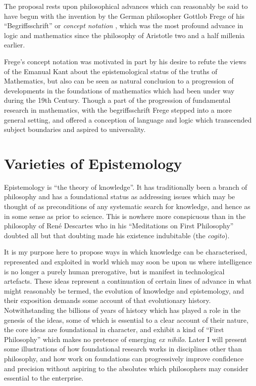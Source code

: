 \documentclass[10pt,titlepage]{book}
\begin{document}
The proposal rests upon philosophical advances which can reasonably be said to have begun with the invention by the German philosopher Gottlob Frege of his ``Begriffsschrift'' or \emph{concept notation} \cite{frege79,heijenoort67}, which was the most profound advance in logic and mathematics since the philosophy of Aristotle two and a half millenia earlier.

Frege's concept notation was motivated in part by his desire to refute the views of the Emanual Kant about the epistemological status of the truths of Mathematics, but also can be seen as natural conclusion to a progression of developments in the foundations of mathematics which had been under way during the 19th Century.
Though a part of the progression of fundamental research in mathematics, with the begriffsschrift Frege stepped into a more general setting, and offered a conception of language and logic which transcended subject boundaries and aspired to universality.

\section{Varieties of Epistemology}

Epistemology is ``the theory of knowledge''.
It has traditionally been a branch of philosophy and has a foundational status as addressing issues which may be thought of as preconditions of any systematic search for knowledge, and hence as in some sense as prior to science.
This is nowhere more conspicuous than in the philosophy of Ren\'{e} Descartes who in his ``Meditations on First Philosophy'' \cite{descartes2013meditations} doubted all but that doubting made his existence indubitable (the \emph{cogito}).

It is my purpose here to propose ways in which knowledge can be characterised, represented and exploited in world which may soon be upon us where intelligence is no longer a purely human prerogative, but is manifest in technological artefacts.
These ideas represent a continuation of certain lines of advance in what might reasonably be termed, the evolution of knowledge and epistemology, and their exposition demands some account of that evolutionary history.
Notwithstanding the billions of years of history which has played a  role in the genesis of the ideas, some of which is essential to a clear account of their nature, the core ideas are foundational in character, and exhibit a kind of ``First Philosophy'' which makes no pretence of emerging \emph{ex nihilo}.
Later I will present some illustrations of how foundational research works in disciplines other than philosophy, and how work on foundations can progressively improve confidence and precision without aspiring to the absolutes which philosophers may consider essential to the enterprise. 
\end{document}
